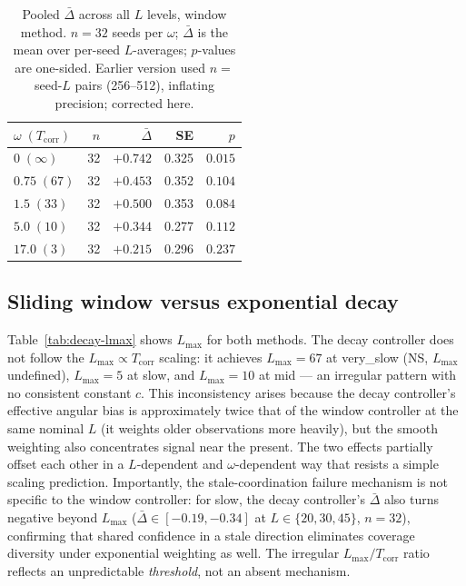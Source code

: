\documentclass[sigconf,anonymous]{aamas}
\newcommand{\Dbar}{\bar{\Delta}}
\newcommand{\Lmax}{L_{\max}}
\newcommand{\Tcorr}{T_{\mathrm{corr}}}
\begin{document}
\begin{table}[t]
\centering
\caption{Pooled $\Dbar$ across all $L$ levels, window method.
         $n{=}32$ seeds per $\omega$; $\Dbar$ is the mean over
         per-seed $L$-averages; $p$-values are one-sided.
         Earlier version used $n{=}$seed-$L$ pairs (256--512),
         inflating precision; corrected here.}
\label{tab:pooled}
\setlength\tabcolsep{4pt}
\begin{tabular}{lrrrr}
\toprule
$\omega\;(\Tcorr)$ & $n$ & $\Dbar$ & SE & $p$ \\
\midrule
$0\;(\infty)$   & 32 & $+0.742$ & 0.325 & $0.015$ \\
$0.75\;(67)$    & 32 & $+0.453$ & 0.352 & $0.104$ \\
$1.5\;(33)$     & 32 & $+0.500$ & 0.353 & $0.084$ \\
$5.0\;(10)$     & 32 & $+0.344$ & 0.277 & $0.112$ \\
$17.0\;(3)$     & 32 & $+0.215$ & 0.296 & $0.237$ \\
\bottomrule
\end{tabular}
\end{table}

\subsection{Sliding window versus exponential decay}
\label{sec:window-vs-decay}

Table~\ref{tab:decay-lmax} shows $\Lmax$ for both methods.
The decay controller does not follow the $\Lmax \propto \Tcorr$
scaling: it achieves $\Lmax{=}67$ at very\_slow (NS, $\Lmax$
undefined), $\Lmax{=}5$ at slow, and $\Lmax{=}10$ at mid — an
irregular pattern with no consistent constant $c$.  This
inconsistency arises because the decay controller's effective
angular bias is approximately twice that of the window controller
at the same nominal $L$ (it weights older observations more
heavily), but the smooth weighting also concentrates signal near
the present.  The two effects partially offset each other in a
$L$-dependent and $\omega$-dependent way that resists a simple
scaling prediction.
Importantly, the stale-coordination failure mechanism is not
specific to the window controller: for slow, the decay controller's
$\Dbar$ also turns negative beyond $\Lmax$
($\Dbar \in [-0.19, -0.34]$ at $L \in \{20, 30, 45\}$, $n{=}32$),
confirming that shared confidence in a stale direction eliminates
coverage diversity under exponential weighting as well.
The irregular $\Lmax/\Tcorr$ ratio reflects an unpredictable
\emph{threshold}, not an absent mechanism.
\end{document}
